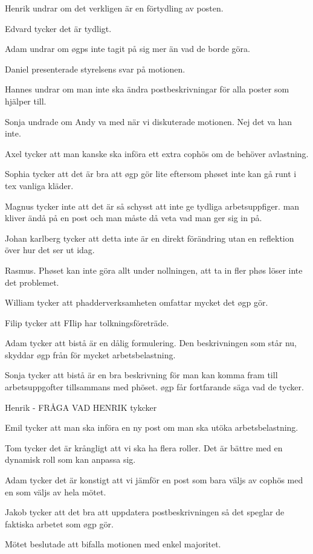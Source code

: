 \documentclass[10pt]{article}
\begin{document}
\begin{paragrafer}
\begin{paragrafer}
		Henrik undrar om det verkligen är en förtydling av posten.

		Edvard tycker det är tydligt. 

		Adam undrar om øgps inte tagit på sig mer än vad de borde göra. 

		Daniel presenterade styrelsens svar på motionen.

		Hannes undrar om man inte ska ändra postbeskrivningar för alla poster som hjälper till.

		Sonja undrade om Andy va med när vi diskuterade motionen. Nej det va han inte.

		Axel tycker att man kanske ska införa ett extra cophös om de behöver avlastning. 

		Sophia tycker att det är bra att øgp gör lite eftersom phøset inte kan gå runt i tex vanliga kläder.

		Magnus tycker inte att det är så schysst att inte ge tydliga arbetsuppfiger. man kliver ändå på en post och man måste då veta vad man ger sig in på.

		Johan karlberg tycker att detta inte är en direkt förändring utan en reflektion över hur det ser ut idag.

		Rasmus. Phøset kan inte göra allt under nollningen, att ta in fler phøs löser inte det problemet. 

		William tycker att phadderverksamheten omfattar mycket det øgp gör. 

		Filip tycker att FIlip har tolkningsföreträde. 

		Adam tycker att bistå är en dålig formulering. Den beskrivningen som står nu, skyddar øgp från för mycket arbetsbelastning.

		Sonja tycker att bistå är en bra beskrivning för man kan komma fram till arbetsuppgofter tillsammans med phöset. øgp får fortfarande säga vad de tycker.

		Henrik - FRÅGA VAD HENRIK tykcker

		Emil tycker att man ska införa en ny post om man ska utöka arbetsbelastning.

		Tom tycker det är krångligt att vi ska ha flera roller. Det är bättre med en dynamisk roll som kan anpassa sig. 

		Adam tycker det är konstigt att vi jämför en post som bara väljs av cophös med en som väljs av hela mötet.

		Jakob tycker att det bra att uppdatera postbeskrivningen så det speglar de faktiska arbetet som øgp gör. 

		Mötet beslutade att bifalla motionen med enkel majoritet. 


\end{paragrafer}
\end{paragrafer}
\end{document}
